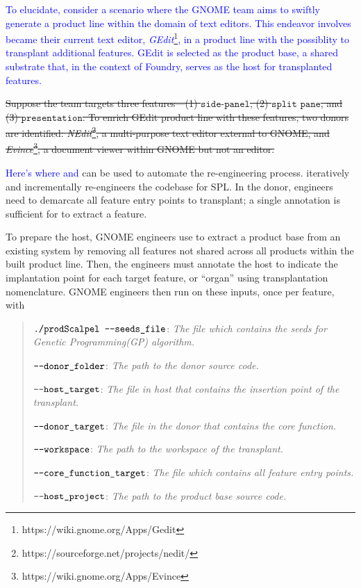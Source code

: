 \textcolor{blue}{To elucidate, consider a scenario where the GNOME team aims to swiftly generate a product line within the domain of text editors. This endeavor involves became their current text editor, \emph{GEdit}\footnote{https://wiki.gnome.org/Apps/Gedit}, in a product line with the possiblity to transplant additional features. GEdit is selected as the product base, a shared substrate that, in the context of Foundry, serves as the host for transplanted features.}

\sout{Suppose the team targets three features—(1) $\texttt{side-panel}$, (2) $\texttt{split pane}$, and (3) $\texttt{presentation}$. To enrich GEdit product line with these features, two donors are identified: \emph{NEdit}\footnote{https://sourceforge.net/projects/nedit/}, a multi-purpose text editor external to GNOME, and \emph{Evince}\footnote{https://wiki.gnome.org/Apps/Evince}, a document viewer within GNOME but not an editor.}
 
\textcolor{blue}{Here's where \FOUNDRY and \prodscalpel} can be used to automate the re-engineering process. \FOUNDRY iteratively and incrementally re-engineers the codebase for SPL. In the donor, engineers need to demarcate all feature entry points to transplant; a single annotation is sufficient for \prodscalpel to extract a feature. 

To prepare the host, GNOME engineers use \prodscalpel to extract a product base from an existing system by removing all features not shared across all products within the built product line. Then, the engineers must annotate the host to indicate the implantation point for each target feature, or “organ” using transplantation nomenclature. GNOME engineers then run \prodscalpel on these inputs, once per feature, with 

\begin{quote}
    $\texttt{./prodScalpel \textemdash \textemdash seeds\_file}$: \textit{ The file which contains the seeds for Genetic Programming(GP) algorithm.} 

    $\texttt{\textemdash \textemdash donor\_folder}$: \textit{The path to the donor source code.} 
    
    $\texttt{\textemdash \textemdash host\_target}$: \textit{The file in host that contains the insertion point of the transplant.}
    
    $\texttt{\textemdash \textemdash donor\_target}$: \textit{The file in the donor that contains the core function.}
    
    $\texttt{\textemdash \textemdash workspace}$: \textit{The path to the workspace of the transplant.}
    
    $\texttt{\textemdash \textemdash core\_function\_target}$: \textit{The file which contains all feature entry points.}
    
     $\texttt{\textemdash \textemdash  host\_project}$: \textit{The path to the product base source code.}
     
   \end{quote} 

